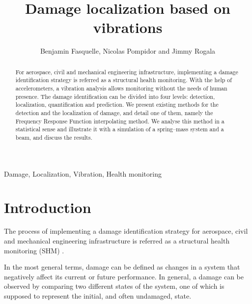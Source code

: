 \documentclass[journal]{IEEEtran}
\begin{document}
%
\title{Damage localization based on vibrations}


\author{Benjamin Fasquelle, Nicolas Pompidor and Jimmy Rogala}

\newtheorem{remark}{Remark}



\maketitle


\begin{abstract}
For aerospace, civil and mechanical engineering infrastructure, implementing a damage identification strategy is referred as a structural health monitoring.
With the help of accelerometers, a vibration analysis allows monitoring without the needs of human presence.
The damage identification can be divided into four levels: detection, localization, quantification and prediction.
We present existing methods for the detection and the localization of damage, and detail one of them, namely the Frequency Response Function interpolating method.
We analyse this method in a statistical sense and illustrate it with a simulation of a spring–mass system and a beam, and discuss the results.



\end{abstract}

\begin{IEEEkeywords}
Damage, Localization, Vibration, Health monitoring
\end{IEEEkeywords}


\IEEEpeerreviewmaketitle



\section{Introduction}


The process of implementing a damage identification strategy for aerospace,
 civil and mechanical engineering infrastructure is referred as a structural health monitoring (SHM) \cite{farrar2007introduction}.

In the most general terms, damage can be defined as changes in a system that negatively affect its current or future performance.
In general, a damage can be observed by comparing two different states of the system,
 one of which is supposed to represent the initial, and often undamaged, state.
\end{document}
